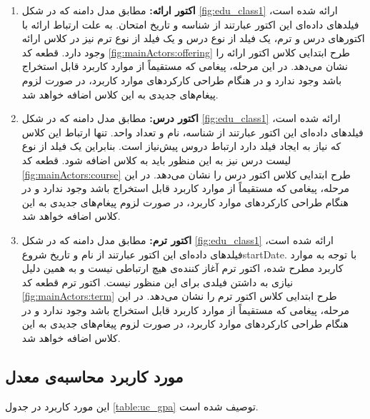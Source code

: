 \begin{enumerate}
\item\textbf{اکتور ارائه:}
مطابق مدل دامنه‌ که در شکل \ref{fig:edu_class1} ارائه شده است، فیلدهای داده‌ای این اکتور عبارتند از شناسه و تاریخ امتحان. به علت ارتباط ارائه با اکتور‌های درس و ترم، یک فیلد از نوع درس و یک فیلد از نوع ترم نیز در کلاس ارائه وجود دارد. قطعه کد \ref{fig:mainActors:offering} طرح ابتدایی کلاس اکتور ارائه را نشان می‌دهد. در این مرحله، پیغامی که مستقیماً از موارد کاربرد قابل استخراج باشد وجود ندارد
و در هنگام طراحی کارکردهای موارد کاربرد، در صورت لزوم پیغام‌های جدیدی به این کلاس اضافه خواهد شد.



\item\textbf{اکتور درس:}
مطابق مدل دامنه‌ که در شکل \ref{fig:edu_class1} ارائه شده است، فیلدهای داده‌ای این اکتور عبارتند از شناسه، نام و تعداد واحد. تنها ارتباط این کلاس که نیاز به ایجاد فیلد دارد ارتباط دروس پیش‌نیاز است. بنابراین یک فیلد از نوع لیست درس نیز به این منظور باید به کلاس اضافه شود. قطعه کد \ref{fig:mainActors:course} طرح ابتدایی کلاس اکتور درس را نشان می‌دهد. در این مرحله، پیغامی که مستقیماً از موارد کاربرد قابل استخراج باشد وجود ندارد
و در هنگام طراحی کارکردهای موارد کاربرد، در صورت لزوم پیغام‌های جدیدی به این کلاس اضافه خواهد شد.
\item\textbf{اکتور ترم:}
مطابق مدل دامنه‌ که در شکل \ref{fig:edu_class1} ارائه شده است، فیلدهای داده‌ای این اکتور عبارتند از نام و تاریخ شروع{startDate}. با توجه به موارد کاربرد مطرح شده، اکتور ترم آغاز کننده‌ی هیچ ارتباطی نیست و به همین دلیل نیازی به داشتن فیلدی برای این منظور نیست. اکتور ترم قطعه کد \ref{fig:mainActors:term} طرح ابتدایی کلاس اکتور ترم را نشان می‌دهد. در این مرحله، پیغامی که مستقیماً از موارد کاربرد قابل استخراج باشد وجود ندارد
و در هنگام طراحی کارکردهای موارد کاربرد، در صورت لزوم پیغام‌های جدیدی به این کلاس اضافه خواهد شد.
\end{enumerate}
\newpage
\subsection{مورد کاربرد محاسبه‌ی معدل}
این مورد کاربرد در جدول \ref{table:uc_gpa} توصیف شده است. 
